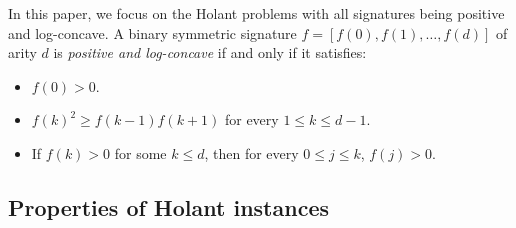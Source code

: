 \documentclass[11pt]{article}
\newtheorem{lemma}[theorem]{Lemma}
\newcommand{\set}[1]{\left\{#1\right\}}
\newcommand{\defeq}{\triangleq} \renewcommand{\d}{\,\-d}
\newcommand{\vecf}{\boldsymbol{f}}
\newcommand{\qtodo}[1]{\todo[color = purple!40, size = \tiny]{\textbf{guoliang:} #1}}
\newcommand{\qgl}[1]{{\color{purple}{#1}}}
\newcommand{\zd}[1]{{\color{green} #1}}
\begin{document}
In this paper, we focus on the Holant problems with all signatures being positive and log-concave. A binary symmetric signature $f = [f(0), f(1), \ldots, f(d)]$ of arity $d$ is \emph{positive and log-concave} if and only if it satisfies:
\begin{itemize}
	\item $f(0) > 0$.
    \item $f(k)^2 \ge f(k - 1) f(k + 1)$ for every $1 \le k \le d - 1$.
    \item If $f(k) > 0$ for some $k \le d$, then for every $0 \le j \le k$, $f(j) > 0$.
\end{itemize}

\fi

\subsection{Properties of Holant instances}
\qgl{check this sec}

\end{document}

